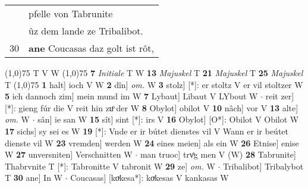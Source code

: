 \documentclass[8pt,a4paper,notitlepage]{article}
\begin{document}
\begin{table}[ht]
\begin{minipage}[t]{0.5\linewidth}
\begin{tabular}{rl}
 & pfelle von Tabrunite\\ 
 & ûz dem lande ze Tribalibot.\\ 
30 & \textbf{ane} Coucasas daz golt ist rôt,\\ 
\end{tabular}
\scriptsize
\line(1,0){75} \newline
T V W \newline
\line(1,0){75} \newline
\textbf{7} \textit{Initiale} T W  \textbf{13} \textit{Majuskel} T  \textbf{21} \textit{Majuskel} T  \textbf{25} \textit{Majuskel} T  \newline
\line(1,0){75} \newline
\textbf{1} halt] ioch V W \textbf{2} dîn] \textit{om.} W \textbf{3} stolz] [*]: er stoltz V er vil stoltzer W \textbf{5} ich dannoch zim] mein mund im W \textbf{7} Lybaut] Libaut V LYbout W  $\cdot$ reit zer] [*]: gieng fúr die V reit hin zuͦ der W \textbf{8} Obylot] obilot V \textbf{10} nâch] vor V \textbf{13} alte] \textit{om.} W  $\cdot$ sân] ie san W \textbf{15} sît] sint [*]: irs V \textbf{16} Obylot] [O*]: Obilot V Obilot W \textbf{17} sichs] sy sei es W \textbf{19} [*]: Vnde er ir bútet dienstes vil V Wann er ir beútet dienste vil W \textbf{23} vremden] werden W \textbf{24} eines meien] als ein W \textbf{26} Etnise] enise W \textbf{27} unversniten] Verschnitten W  $\cdot$ man truoc] trvͦg men V (W) \textbf{28} Tabrunite] Thabrvnite T [*]: Tabronitte V tabronit W \textbf{29} ze] \textit{om.} W  $\cdot$ Tribalibot] Tribalybot T \textbf{30} ane] In W  $\cdot$ Coucasas] [koͮkesa*]: koͮkesas V kankasas W \newline
\end{minipage}
\end{table}
\end{document}
